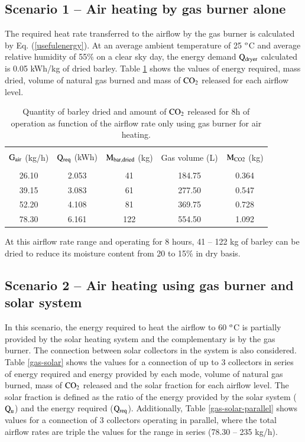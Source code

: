 \subsection{Scenario 1 -- Air heating by gas burner alone}

The required heat rate transferred to the airflow by the gas burner is calculated by Eq. (\ref{usefulenergy}). At an average ambient temperature of 25 $^{\rm{o}}$C and average relative humidity of 55\% on a clear sky day, the energy demand $\rm{Q_{dryer}}$ calculated is 0.05 kWh/kg of dried barley. Table \ref{gas-only} shows the values of energy required, mass dried, volume of natural gas burned and mass of $\rm{CO_2}$ released for each airflow level.

\begin{table}[h]
	\caption{Quantity of barley dried and amount of $\rm{CO_2}$ released for 8h of operation as function of the airflow rate only using gas burner for air heating.}
	\centering
	
	\begin{tabular}{ccccc}
		\hline \\ [-10pt]
		$\rm{G_{air}}$ (kg/h) & $\rm{Q_{req}}$ (kWh) & $\rm{M_{bar,dried}}$ (kg) & Gas volume (L) & $\rm{M_{CO2}}$ (kg) \\
		\hline \\ [-12pt]
		26.10 & 2.053 & 41 & 184.75 & 0.364 \\ [2pt]
		39.15 & 3.083 & 61 & 277.50 & 0.547 \\ [2pt]
		52.20 & 4.108 & 81 & 369.75 & 0.728 \\ [2pt]
		78.30 & 6.161 & 122 & 554.50 & 1.092 \\ 
		\hline
	\end{tabular}
	
	\label{gas-only}
\end{table}

At this airflow rate range and operating for 8 hours, 41 -- 122 kg of barley can be dried to reduce its moisture content from 20 to 15\% in dry basis.

\subsection{Scenario 2 -- Air heating using gas burner and solar system}

In this scenario, the energy required to heat the airflow to 60 $^{\rm{o}}$C is partially provided by the solar heating system and the complementary is by the gas burner. The connection between solar collectors in the system is also considered. Table \ref{gas-solar} shows the values for a connection of up to 3 collectors in series of energy required and energy provided by each mode, volume of natural gas burned, mass of $\rm{CO_2}$ released and the solar fraction for each airflow level. The solar fraction is defined as the ratio of the energy provided by the solar system ($\rm{Q_u}$) and the energy required ($\rm{Q_{req}}$). Additionally, Table \ref{gas-solar-parallel} shows values for a connection of 3 collectors operating in parallel, where the total airflow rates are triple the values for the range in series (78.30 -- 235 kg/h).


